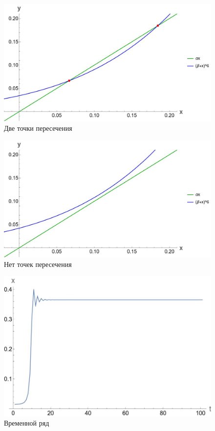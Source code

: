 \documentclass[14pt]{extarticle}
\begin{document}
        \begin{figure}[ht]
            \centering
            \includegraphics[width=\textwidth]{images/two_intersection.jpg}
            \caption{Две точки пересечения}
        \end{figure}

        \begin{figure}[ht]
            \centering
            \includegraphics[width=\textwidth]{images/zero_intersection.jpg}
            \caption{Нет точек пересечения}
        \end{figure}

        \begin{figure}[ht]
            \centering
            \includegraphics[width=\textwidth]{images/time_series.jpg}
            \caption{Временной ряд}
        \end{figure}
\end{document}
